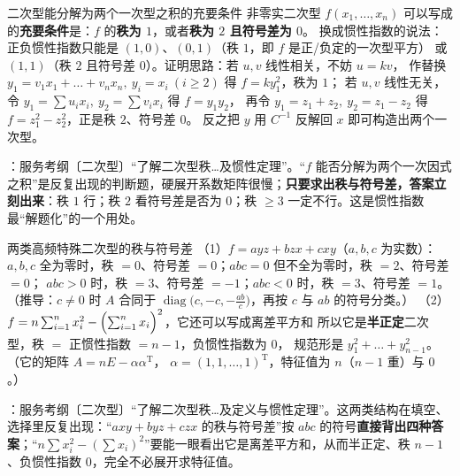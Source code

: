 \begin{fdeep}{二次型能分解为两个一次型之积的充要条件}
非零实二次型 $f(x_1,\dots,x_n)$ 可以写成
的\textbf{充要条件}是：$f$ 的\textbf{秩为 $1$}，或者\textbf{秩为 $2$ 且符号差为 $0$}。
换成惯性指数的说法：正负惯性指数只能是 $(1,0)$、$(0,1)$（秩 $1$，即 $f$ 是正/负定的一次型平方）
或 $(1,1)$（秩 $2$ 且符号差 $0$）。证明思路：若 $u,v$ 线性相关，不妨 $u=kv$，
作替换 $y_1=v_1x_1+\dots+v_nx_n,\ y_i=x_i\ (i\ge2)$ 得 $f=ky_1^{2}$，秩为 $1$；
若 $u,v$ 线性无关，令 $y_1=\sum u_ix_i,\ y_2=\sum v_ix_i$ 得 $f=y_1y_2$，
再令 $y_1=z_1+z_2,\ y_2=z_1-z_2$ 得 $f=z_1^{2}-z_2^{2}$，正是秩 $2$、符号差 $0$。
反之把 $y$ 用 $C^{-1}$ 反解回 $x$ 即可构造出两个一次型。

\fbref{}：服务考纲〔二次型〕“了解二次型秩…及惯性定理”。“$f$ 能否分解为两个一次因式之积”是反复出现的判断题，硬展开系数矩阵很慢；\textbf{只要求出秩与符号差，答案立刻出来}：秩 $1$ 行；秩 $2$ 看符号差是否为 $0$；秩 $\ge3$ 一定不行。这是惯性指数最“解题化”的一个用处。
\end{fdeep}

\begin{fdeep}{两类高频特殊二次型的秩与符号差}
（1）$f=ayz+bzx+cxy$（$a,b,c$ 为实数）：
$a,b,c$ 全为零时，秩 $=0$、符号差 $=0$；$abc=0$ 但不全为零时，秩 $=2$、符号差 $=0$；
$abc>0$ 时，秩 $=3$、符号差 $=-1$；$abc<0$ 时，秩 $=3$、符号差 $=1$。
（推导：$c\ne0$ 时 $A$ 合同于 $\operatorname{diag}\bigl(c,-c,-\frac{ab}{c}\bigr)$，再按 $c$ 与 $ab$ 的符号分类。）
（2）$f=n\sum_{i=1}^{n}x_i^{2}-\Bigl(\sum_{i=1}^{n}x_i\Bigr)^{2}$，它还可以写成离差平方和
所以它是\textbf{半正定}二次型，秩 $=$ 正惯性指数 $=n-1$，负惯性指数为 $0$，
规范形是 $y_1^{2}+\dots+y_{n-1}^{2}$。（它的矩阵 $A=nE-\alpha\alpha^{\mathrm T}$，
$\alpha=(1,1,\dots,1)^{\mathrm T}$，特征值为 $n$（$n-1$ 重）与 $0$。）

\fbref{}：服务考纲〔二次型〕“了解二次型秩…及定义与惯性定理”。这两类结构在填空、选择里反复出现：“$axy+byz+czx$ 的秩与符号差”按 $abc$ 的符号\textbf{直接背出四种答案}；“$n\sum x_i^{2}-(\sum x_i)^{2}$”要能一眼看出它是离差平方和，从而半正定、秩 $n-1$、负惯性指数 $0$，完全不必展开求特征值。
\end{fdeep}

